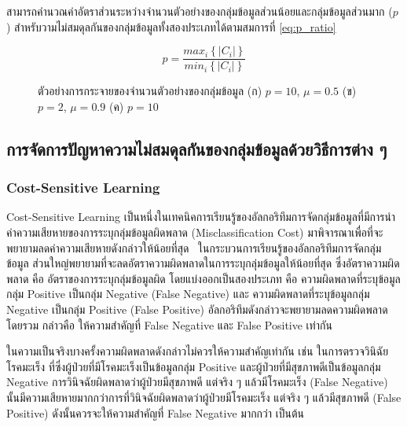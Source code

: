 สามารถคำนวณค่าอัตราส่วนระหว่างจำนวนตัวอย่างของกลุ่มข้อมูลส่วนน้อยและกลุ่มข้อมูลส่วนมาก ($p$) สำหรับวามไม่สมดุลกันของกลุ่มข้อมูลทั้งสองประเภทได้ตามสมการที่ \ref{eq:p_ratio}

\begin{equation}
  p = \frac{max_{i}\left \{ \left | C_{i} \right | \right \}}{min_{i}\left \{ \left | C_{i} \right | \right \}}
  \label{eq:p_ratio}
\end{equation}

\begin{figure}[h]
  \centering
  \caption{ตัวอย่างการกระจายของจำนวนตัวอย่างของกลุ่มข้อมูล (ก) $p = 10$, $\mu = 0.5$ (ข) $p = 2$, $\mu = 0.9$ (ค) $p = 10$}
  \label{fig:imb-dist}
\end{figure}
\FloatBarrier

\subsection{การจัดการปัญหาความไม่สมดุลกันของกลุ่มข้อมูลด้วยวิธีการต่าง ๆ}
\subsubsection{Cost-Sensitive Learning}
Cost-Sensitive Learning เป็นหนึ่งในเทคนิคการเรียนรู้ของอัลกอริทึมการจัดกลุ่มข้อมูลที่มีการนำ ค่าความเสียหายของการระบุกลุ่มข้อมูลผิดพลาด (Misclassification Cost) มาพิจารณาเพื่อที่จะพยายามลดค่าความเสียหายดังกล่าวให้น้อยที่สุด~\cite{Ling-CS:2010} 
ในกระบวนการเรียนรู้ของอัลกอริทึมการจัดกลุ่มข้อมูล ส่วนใหญ่พยายามที่จะลดอัตราความผิดพลาดในการระบุกลุ่มข้อมูลให้น้อยที่สุด ซึ่งอัตราความผิดพลาด คือ อัตราของการระบุกลุ่มข้อมูลผิด 
โดยแบ่งออกเป็นสองประเภท คือ ความผิดพลาดที่ระบุข้อมูลกลุ่ม Positive เป็นกลุ่ม Negative (False Negative) และ ความผิดพลาดที่ระบุข้อมูลกลุ่ม Negative เป็นกลุ่ม Positive (False Positive) 
อัลกอริทึมดังกล่าวจะพยายามลดความผิดพลาดโดยรวม กล่าวคือ ให้ความสำคัญที่ False Negative และ False Positive เท่ากัน

ในความเป็นจริงบางครั้งความผิดพลาดดังกล่าวไม่ควรให้ความสำคัญเท่ากัน เช่น ในการตรวจวินิฉัยโรคมะเร็ง ที่ซึ่งผู้ป่วยที่มีโรคมะเร็งเป็นข้อมูลกลุ่ม Positive และผู้ป่วยที่มีสุขภาพดีเป็นข้อมูลกลุ่ม Negative 
การวินิจฉัยผิดพลาดว่าผู้ป่วยมีสุขภาพดี แต่จริง ๆ แล้วมีโรคมะเร็ง (False Negative) นั้นมีความเสียหายมากกว่าการที่วินิจฉัยผิดพลาดว่าผู้ป่วยมีโรคมะเร็ง แต่จริง ๆ แล้วมีสุขภาพดี (False Positive) ดังนั้นควรจะให้ความสำคัญที่ False Negative มากกว่า เป็นต้น 

